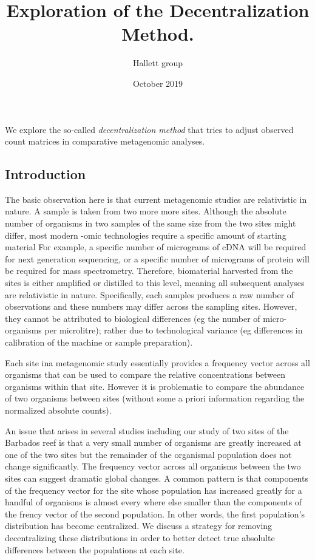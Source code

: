 \documentclass{article}\usepackage[]{graphicx}\usepackage[]{color}
\title{Exploration of the Decentralization Method.}
\date{October 2019}
\author{Hallett group}
\begin{document}

\maketitle

We explore the so-called {\em decentralization method} that tries to adjust observed
count matrices in comparative metagenomic analyses.

\subsection{Introduction}

The basic observation here is that current metagenomic studies are relativistic in nature.
A sample is taken from two more more sites. 
Although the absolute number of organisms in two samples of the same size from
the two sites might differ, 
most modern -omic technologies require a specific amount of starting material
For example, a specific number of micrograms of cDNA will be required for next
generation sequencing, or a specific number of micrograms of protein will be required
for mass spectrometry.
Therefore, biomaterial harvested from the sites is either amplified or distilled to
this level, meaning all subsequent analyses are relativistic in nature.
Specifically, each samples produces a raw number of observations and these numbers
may differ across the sampling sites.
However, they cannot be attributed to biological differences (eg the number of micro-organisms
per microlitre); rather due to technological variance (eg differences in calibration 
of the machine or sample preparation).

Each site ina metagenomic study essentially provides a frequency vector across all organisms 
that can be used to compare the relative concentrations between organisms within that site.
However it is problematic to compare the abundance of two organisms between sites (without
some a priori information regarding the normalized absolute counts).

An issue that arises in several studies including our study of two sites of the Barbados reef is 
that  a very small number of organisms are greatly increased at one of the two sites but the 
remainder of the organismal population does not change significantly.
The frequency vector across all organisms between the two sites can suggest dramatic global changes.
A common pattern is that components of the frequency vector for the site whose population has increased greatly for a handful of organisms is almost every where else smaller than the components of the frency vector of the second population. 
In other words, the first population's distribution has become centralized.
We discuss a strategy for removing decentralizing these distributions in order to better detect true absolulte differences between the populations at each site.
\end{document}
